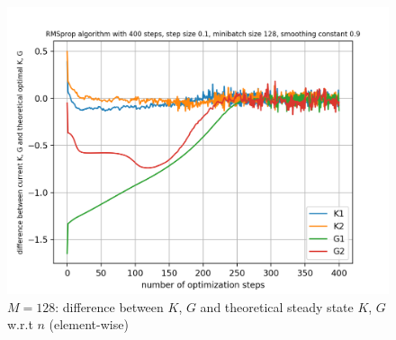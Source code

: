 \documentclass{article}
\begin{document}
\begin{figure}[h!]
\begin{minipage}[t]{.28\paperwidth}
		\includegraphics[width=1.0\textwidth]{Figures/d_M128_sep.png}
		\caption{$M=128$: difference between $K$, $G$ and theoretical steady state $K$, $G$ w.r.t $n$ (element-wise)}
	\end{minipage}
\end{figure}
\clearpage
\end{document}
